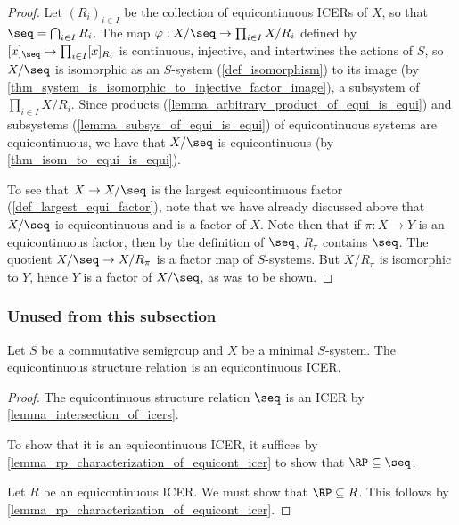 \begin{proof}
    Let $(R_i)_{i \in I}$ be the collection of equicontinuous ICERs of $X$, so that $\seq = \bigcap_{i \in I} R_i$.  The map
    $\varphi: X / \seq \to \prod_{i \in I} X/R_i$ defined by $[x]_{\seq} \mapsto \prod_{i \in I} [x]_{R_i}$ is continuous, injective, and intertwines the actions of $S$, so $X/\seq$ is isomorphic as an $S$-system (\cref{def_isomorphism}) to its image (by \cref{thm_system_is_isomorphic_to_injective_factor_image}), a subsystem of $\prod_{i \in I} X/R_i$.  Since products (\cref{lemma_arbitrary_product_of_equi_is_equi}) and subsystems (\cref{lemma_subsys_of_equi_is_equi}) of equicontinuous systems are equicontinuous, we have that $X / \seq$ is equicontinuous (by \cref{thm_isom_to_equi_is_equi}).

    To see that $X \to X / \seq$ is the largest equicontinuous factor (\cref{def_largest_equi_factor}), note that we have already discussed above that $X / \seq$ is equicontinuous and is a factor of $X$.  Note then that if $\pi : X \to Y$ is an equicontinuous factor, then by the definition of $\seq$, $R_\pi$ contains $\seq$.  The quotient $X / \seq \to X / R_\pi$ is a factor map of $S$-systems.  But $X / R_\pi$ is isomorphic to $Y$, hence $Y$ is a factor of $X/\seq$, as was to be shown.
\end{proof}

\subsubsection{Unused from this subsection}

\begin{theorem}
\label{thm_equi_structure_relation_is_equi_ICER}
\leanok{}
    Let $S$ be a commutative semigroup and $X$ be a minimal $S$-system.  The equicontinuous structure relation is an equicontinuous ICER.
\end{theorem}

\begin{proof}
\leanok{}
    The equicontinuous structure relation $\seq$ is an ICER by \cref{lemma_intersection_of_icers}.

    To show that it is an equicontinuous ICER, it suffices by \cref{lemma_rp_characterization_of_equicont_icer} to show that $\RP \subseteq \seq$.
    
    Let $R$ be an equicontinuous ICER.  We must show that $\RP \subseteq R$.  This follows by \cref{lemma_rp_characterization_of_equicont_icer}.
\end{proof}

